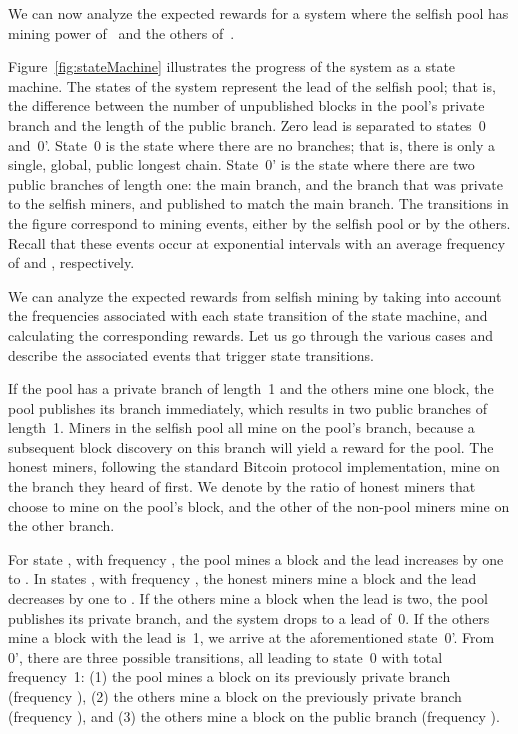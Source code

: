 \documentclass[letterpaper]{llncs}
\begin{document}
We can now analyze the expected rewards for a system where the selfish pool has mining power of~ and the others of~. 

Figure~\ref{fig:stateMachine} illustrates the progress of the system as a state machine. The states of the system represent the lead of the selfish pool; that is, the difference between the number of unpublished blocks in the pool's private branch and the length of the public branch. Zero lead is separated to states~0 and~0'. State~0 is the state where there are no branches; that is, there is only a single, global, public longest chain. State~0' is the state where there are two public branches of length one: the main branch, and the branch that was private to the selfish miners, and published to match the main branch. The transitions in the figure correspond to mining events, either by the selfish pool or by the others. Recall that these events occur at exponential intervals with an average frequency of  and , respectively. 

We can analyze the expected rewards from selfish mining by taking into account the frequencies associated with each state transition of the state machine, and calculating the corresponding rewards. Let us go through the various cases and describe the associated events that trigger state transitions. 

If the pool has a private branch of length~1 and the others mine one block, the pool publishes its branch immediately, which results in two public branches of length~1. Miners in the selfish pool all mine on the pool's branch, because a subsequent block discovery on this branch will yield a reward for the pool. The honest miners, following the standard Bitcoin protocol implementation, mine on the branch they heard of first. We denote by  the ratio of honest miners that choose to mine on the pool's block, and the other  of the non-pool miners mine on the other branch. 

For state , with frequency , the pool mines a block and the lead increases by one to . In states , with frequency , the honest miners mine a block and the lead decreases by one to . 
If the others mine a block when the lead is two, the pool publishes its private branch, and the system drops to a lead of~0. 
If the others mine a block with the lead is~1, we arrive at the aforementioned state~0'. From 0', there are three possible transitions, all leading to state~0 with total frequency~1: (1) the pool mines a block on its previously private branch (frequency ), (2) the others mine a block on the previously private branch (frequency ), and (3) the others mine a block on the public branch (frequency ). 
\end{document}
